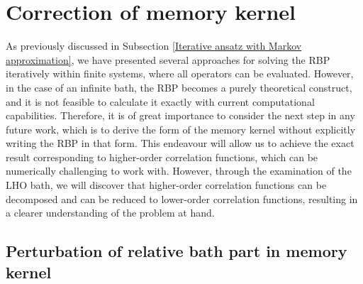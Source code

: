 \section{Correction of memory kernel}
\label{Correction of memory kernel}

As previously discussed in Subsection \ref{Iterative ansatz with Markov approximation}, we have presented several approaches for solving the RBP iteratively within finite systems, where all operators can be evaluated. However, in the case of an infinite bath, the RBP becomes a purely theoretical construct, and it is not feasible to calculate it exactly with current computational capabilities. Therefore, it is of great importance to consider the next step in any future work, which is to derive the form of the memory kernel without explicitly writing the RBP in that form. This endeavour will allow us to achieve the exact result corresponding to higher-order correlation functions, which can be numerically challenging to work with. However, through the examination of the LHO bath, we will discover that higher-order correlation functions can be decomposed and can be reduced to lower-order correlation functions, resulting in a clearer understanding of the problem at hand.

\subsection{Perturbation of relative bath part in memory kernel}
\label{Exact perturbation of relative bath part in memory kernel}


